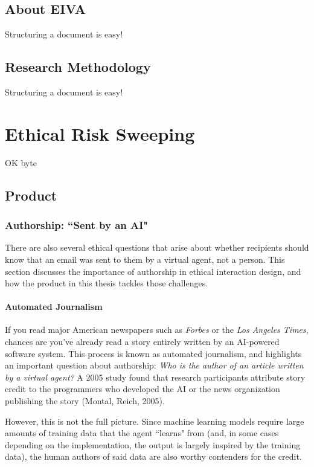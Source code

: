 \documentclass{article}
\begin{document}
\subsection{About EIVA}

Structuring a document is easy!

\subsection{Research Methodology}

Structuring a document is easy!

\section{Ethical Risk Sweeping}

OK byte

\subsection{Product}

\subsubsection{Authorship: ``Sent by an AI"}

There are also several ethical questions that arise about whether recipients should know that an email was sent to them by a virtual agent, not a person. This section discusses the importance of authorship in ethical interaction design, and how the product in this thesis tackles those challenges.

\paragraph{Automated Journalism}


If you read major American newspapers such as \emph{Forbes} or the \emph{Los Angeles Times}, chances are you've already read a story entirely written by an AI-powered software system. This process is known as automated journalism, and highlights an important question about authorship: \emph{Who is the author of an article written by a virtual agent?} A 2005 study found that research participants attribute story credit to the programmers who developed the AI or the news organization publishing the story (Montal, Reich, 2005). 

However, this is not the full picture. Since machine learning models require large amounts of training data that the agent ``learns" from (and, in some cases depending on the implementation, the output is largely inspired by the training data), the human authors of said data are also worthy contenders for the credit.
\end{document}
